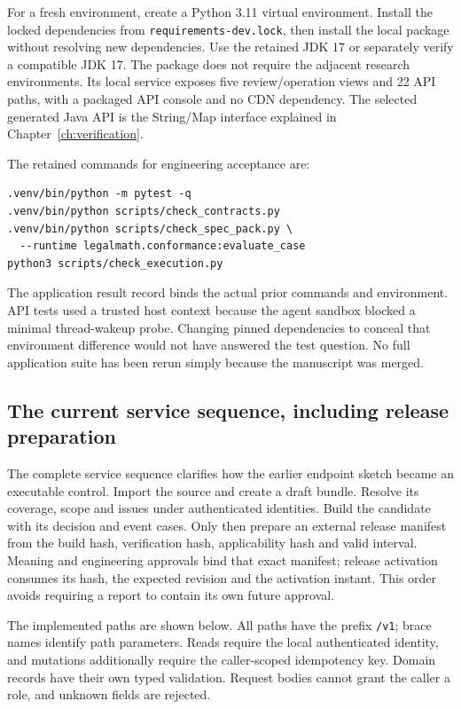 For a fresh environment, create a Python 3.11 virtual environment. Install the
locked dependencies from \texttt{requirements-dev.lock}, then install the local
package without resolving new dependencies. Use the retained JDK 17 or separately verify a compatible
JDK 17. The package does not require the adjacent research environments. Its
local service exposes five review/operation views and 22 API paths, with a
packaged API console and no CDN dependency. The selected generated Java API is
the String/Map interface explained in Chapter~\ref{ch:verification}.


The retained commands for engineering acceptance are:
\begin{lstlisting}
.venv/bin/python -m pytest -q
.venv/bin/python scripts/check_contracts.py
.venv/bin/python scripts/check_spec_pack.py \
  --runtime legalmath.conformance:evaluate_case
python3 scripts/check_execution.py
\end{lstlisting}
The application result record binds the actual prior commands and environment.
API tests used a trusted host context because the agent sandbox blocked a
minimal thread-wakeup probe. Changing pinned dependencies to conceal that
environment difference would not have answered the test question. No full
application suite has been rerun simply because the manuscript was merged.

\subsection{The current service sequence, including release preparation}

The complete service sequence clarifies how the earlier endpoint sketch became
an executable control. Import the source and create a draft bundle. Resolve
its coverage, scope and issues under authenticated identities. Build the
candidate with its decision and event cases. Only then prepare an external
release manifest from the build hash, verification hash, applicability hash
and valid interval. Meaning and engineering approvals bind that exact manifest;
release activation consumes its hash, the expected revision and the activation
instant. This order avoids requiring a report to contain its own future approval.

The implemented paths are shown below. All paths have the prefix
\texttt{/v1}; brace names identify path parameters. Reads require the local
authenticated identity, and mutations additionally require the caller-scoped
idempotency key. Domain records have their own typed validation. Request bodies
cannot grant the caller a role, and unknown fields are rejected.

